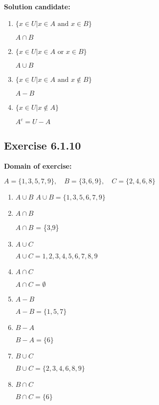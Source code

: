 \documentclass{report}
\newcommand{\cent}[1]{\begin{center}#1\end{center}}
\newcommand{\In}{\! \in \!}
\newcommand{\Domain}{\textbf{Domain of exercise: }}
\newcommand{\Solution}{\textbf{Solution candidate: }}
\newcommand{\Exercise}[1]{\subsection{Exercise #1}}
\newcommand{\defaultEnumerateLabel}{\textbf{\alph*.}}
\begin{document}
	\Solution
	\begin{enumerate}[label=\defaultEnumerateLabel]
		\item $\{x \in U | x \In A \text{ and } x \In B\}$
		
		\cent{$A \cap B$}
		
		\item $\{x \In U | x \In A \text{ or } x \In B\}$
		
		\cent{$A \cup B$}
		
		\item $\{x \In U | x \In A \text{ and } x \notin B \}$
		
		\cent{$A - B$}
		
		\item $\{x \In U | x \notin A \}$
		
		\cent{$A^c = U - A$}
		
		\end{enumerate}
		
		\Exercise{6.1.10}
		
		\Domain
		\cent{$A = \{1,3,5,7,9\}, \quad B = \{3,6,9\}, \quad C = \{2,4,6,8\}$}
				
		
		\begin{enumerate}[label = \defaultEnumerateLabel]
			\item $A \cup B$
			$A \cup B = \{1,3,5,6,7,9\}$
			
			\item $A \cap B$
			
			$A \cap B$ = \{3,9\}
			
			\item $A \cup C$
			
			\cent{$A \cup C = 1,2,3,4,5,6,7,8,9$}
			
			\item $A \cap C$
			
			\cent{$A \cap C = \emptyset$}
			
			\item $A-B$
			
			\cent{$A-B = \{1,5,7\}$}
			
			\item $B-A$
			
			\cent{$B - A = \{6\}$}
			
			\item $B \cup C$
			
			\cent{$B \cup C = \{2,3,4,6,8,9\}$}
			
			\item $B \cap C$
			
			\cent{$B \cap C = \{6\}$}
		\end{enumerate}
		
\end{document}
